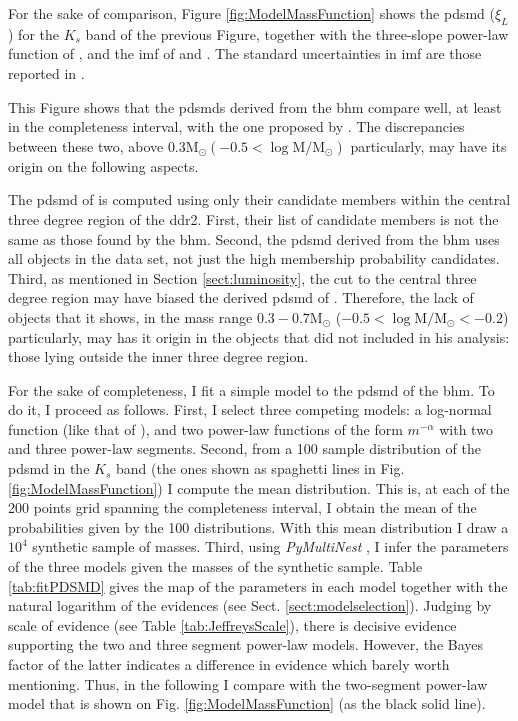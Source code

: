 For the sake of comparison, Figure \ref{fig:ModelMassFunction} shows the \gls{pdsmd} ($\xi_L$) for the $K_s$ band of the previous Figure, together with the three-slope power-law function of \citet{Bouy2015}, and the \gls{imf} of \citet{Thies2007} and \citet{Chabrier2005}. The standard uncertainties in \citet{Chabrier2005} \gls{imf} are those reported in \citet{Chabrier2003b}. 

This Figure shows that the \glspl{pdsmd} derived from the \gls{bhm} compare well, at least in the completeness interval, with the one proposed by \citet{Bouy2015}. The discrepancies between these two, above $0.3 \mathrm{M_{\odot}} (-0.5 < \log \mathrm{M/M_{\odot}})$ particularly, may have its origin on the following aspects.

The \gls{pdsmd} of \citet{Bouy2015} is computed using only their candidate members within the central three degree region of the \gls{ddr2}. First, their list of candidate members is not the same as those found by the \gls{bhm}. Second, the \gls{pdsmd} derived from the \gls{bhm} uses all objects in the data set, not just the high membership probability candidates. Third, as mentioned in Section \ref{sect:luminosity}, the cut to the central three degree region may have biased the derived \gls{pdsmd} of \citet{Bouy2015}. Therefore, the lack of objects that it shows,  in the mass range $0.3 - 0.7 \mathrm{M_{\odot}}$ ($-0.5 < \log \mathrm{M/M_{\odot}} < -0.2$) particularly, may has it origin in the objects that \citet{Bouy2015} did not included in his analysis: those lying outside the inner three degree region. 

For the sake of completeness, I fit a simple model to the \gls{pdsmd} of the \gls{bhm}. To do it, I proceed as follows. First, I select three competing models: a log-normal function (like that of \citet{Chabrier2003b,Chabrier2005}), and two power-law functions of the form $m^{-\alpha}$ with two and three power-law segments. Second, from a 100 sample distribution of the \gls{pdsmd} in the $K_s$ band (the ones shown as spaghetti lines in Fig. \ref{fig:ModelMassFunction}) I compute the mean distribution. This is, at each of the 200 points grid spanning the completeness interval, I obtain the mean of the probabilities given by the 100 distributions. With this mean distribution I draw a $10^4$ synthetic sample of masses. Third, using \emph{PyMultiNest} \citep{Buchner2014}, I infer the parameters of the three models given the masses of the synthetic sample. Table \ref{tab:fitPDSMD} gives the \gls{map} of the parameters in each model together with the natural logarithm of the evidences (see Sect. \ref{sect:modelselection}). Judging by \citet{Jeffreys61} scale of evidence (see Table \ref{tab:JeffreysScale}), there is decisive evidence supporting the two and three segment power-law models. However, the Bayes factor of the latter indicates a difference in evidence which barely worth mentioning. Thus, in the following I compare with the two-segment power-law model that is shown on Fig. \ref{fig:ModelMassFunction} (as the black solid line).

